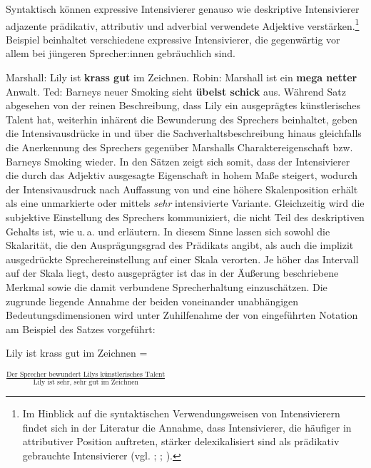 Syntaktisch können expressive Intensivierer genauso wie deskriptive Intensivierer adjazente prädikativ, attributiv und adverbial verwendete Adjektive verstärken.\footnote{Im Hinblick auf die syntaktischen Verwendungsweisen von Intensivierern findet sich in der Literatur die Annahme, dass Intensivierer, die häufiger in attributiver Position auftreten, stärker delexikalisiert sind als prädikativ gebrauchte Intensivierer (vgl. {\citealt[271]{Ito.2003}}; \citealt[373]{Tagliamonte.2008}; \citealt[116]{Tagliamonte.2014}).} Beispiel  beinhaltet verschiedene expressive Intensivierer, die gegenwärtig vor allem bei jüngeren Sprecher:innen gebräuchlich sind.

\ea  \label{Expr0}
\ea Marshall: \glqq{}Lily ist \textbf{krass gut} im Zeichnen.\grqq{} \label{lily}
\ex Robin: \glqq{}Marshall ist ein \textbf{mega netter} Anwalt.\grqq{}  \label{GNB1}
\ex Ted: \glqq{}Barneys neuer Smoking sieht \textbf{übelst schick} aus.\grqq{}  \label{Anzug}
 \z
 \z
Während Satz  abgesehen von der reinen Beschreibung, dass Lily ein ausgeprägtes künstlerisches Talent hat, weiterhin inhärent die Bewunderung des Sprechers beinhaltet, geben die Intensivausdrücke in { und } über die Sachverhaltsbeschreibung hinaus gleichfalls die Anerkennung des Sprechers gegenüber Marshalls Charaktereigenschaft bzw. Barneys Smoking wieder. In den Sätzen zeigt sich somit, dass der Intensivierer die durch das Adjektiv ausgesagte Eigenschaft in hohem Maße steigert, wodurch der Intensivausdruck nach Auffassung von \citet[22]{Paradis.1997} und {\citet[133]{Gutzmann.2019a}} eine höhere Skalenposition erhält als eine unmarkierte oder mittels \textit{sehr} intensivierte Variante. Gleichzeitig wird die subjektive Einstellung des Sprechers kommuniziert, die nicht Teil des deskriptiven Gehalts ist, wie u.\,a. \citet[10]{Paradis.1997} und {\citet[560]{Athanasiadou.2007}} erläutern. In diesem Sinne lassen sich sowohl die Skalarität, die den Ausprägungsgrad des Prädikats angibt, als auch die implizit ausgedrückte Sprechereinstellung auf einer Skala verorten. Je höher das Intervall auf der Skala liegt, desto ausgeprägter ist das in der Äußerung beschriebene Merkmal sowie die damit verbundene Sprecherhaltung einzuschätzen. Die zugrunde liegende Annahme der beiden voneinander unabhängigen Bedeutungsdimensionen wird unter Zuhilfenahme der von {\citet[5]{Gutzmann.2013a}} eingeführten Notation am Beispiel des {Satzes  vorgeführt}: \medskip

\noindent Lily ist krass gut im Zeichnen = \begin{large} $\frac{\text{Der Sprecher bewundert Lilys künstlerisches Talent}}{\text{Lily ist sehr, sehr gut im Zeichnen}}$ \end{large}
\medskip

